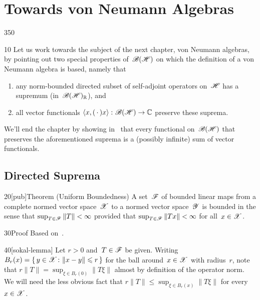 \section{Towards von Neumann Algebras}
\begin{parsec}{350}%
\begin{point}{10}%
Let us work towards
the subject of the next chapter, von Neumann algebras,
by pointing out two special properties
of~$\mathscr{B}(\mathscr{H})$
on which the definition of a von Neumann algebra is based,
namely that
\begin{enumerate}
\item
any norm-bounded directed subset of
self-adjoint operators on~$\mathscr{H}$
has a supremum (in~$\mathscr{B}(\mathscr{H})_{\mathbb{R}}$), and
\item
all vector functionals
$\left<x,(\,\cdot\,)x\right>\colon \mathscr{B}(\mathscr{H})\to\mathbb{C}$ 
preserve these suprema.
\end{enumerate}
We'll end
the chapter
by showing
in~
 that every  functional on~$\mathscr{B}(\mathscr{H})$
that  preserves the aforementioned
suprema
is a (possibly infinite) sum of vector functionals.
\end{point}

\subsection{Directed Suprema}
\begin{point}{20}[pub]{Theorem (Uniform Boundedness)}%
%
%
A set~$\mathscr{F}$ of bounded linear maps 
from a complete normed vector space~$\mathscr{X}$
to a normed vector space~$\mathscr{Y}$
is bounded
in the sense that $\sup_{T\in \mathscr{F}} \|T\|<\infty$
provided that 
 $\sup_{T\in \mathscr{F}} \|Tx\|<\infty$
 for all~$x\in \mathscr{X}$.
\begin{point}{30}{Proof}%
Based on~\cite{sokal}.
\begin{point}{40}[sokal-lemma]%
Let $r>0$ and~$T\in\mathscr{F}$ be given.
Writing~$B_r(x)=\{\,y\in\mathscr{X}\colon \|x-y\|\leqslant r\,\}$
for the ball around~$x\in\mathscr{X}$ with radius~$r$,
note that $r\|T\|=\sup_{\xi\in B_r(0)} \|T \xi\|$
almost by definition of the operator norm.
We will need the less obvious fact
that $r\|T\|\leq \sup_{\xi \in B_r(x)}\|T \xi\|$
for every~$x\in \mathscr{X}$.


\end{point}
\end{point}
\end{point}
\end{parsec}
